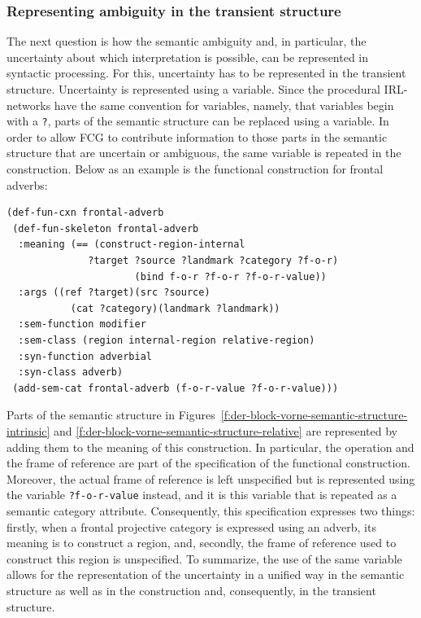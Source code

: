 \subsubsection{Representing ambiguity in the transient structure}
The next question is how the semantic ambiguity and, in particular, the
uncertainty about which interpretation is possible, can be represented 
in syntactic processing. For this, uncertainty has to be represented in the 
transient structure. Uncertainty is represented using a variable. 
Since the procedural IRL-networks have the same convention for variables, 
namely, that variables begin with a {\footnotesize\tt ?}, parts of the 
semantic structure can be replaced using a variable. 
In order to allow FCG to contribute information to those parts in the semantic 
structure that are uncertain or ambiguous, the same variable is repeated in the 
construction. Below as an example is the functional construction for frontal adverbs:

\ea
\label{e:def-fun-frontal-adverb}
\begin{lstlisting}
(def-fun-cxn frontal-adverb 
 (def-fun-skeleton frontal-adverb
  :meaning (== (construct-region-internal 
              ?target ?source ?landmark ?category ?f-o-r)
                      (bind f-o-r ?f-o-r ?f-o-r-value))
  :args ((ref ?target)(src ?source)
           (cat ?category)(landmark ?landmark))
  :sem-function modifier
  :sem-class (region internal-region relative-region)
  :syn-function adverbial
  :syn-class adverb)
 (add-sem-cat frontal-adverb (f-o-r-value ?f-o-r-value)))
\end{lstlisting}
\z

Parts of the semantic structure in Figures~\ref{f:der-block-vorne-semantic-structure-intrinsic} and 
\ref{f:der-block-vorne-semantic-structure-relative} are represented by 
adding them to the meaning of this construction.
In particular, the operation and the frame of reference are part of the 
specification of the functional construction. 
Moreover, the actual frame of reference is left unspecified but is 
represented using the variable {\footnotesize\tt ?f-o-r-value}
instead, and it is this variable that is repeated as a semantic category 
attribute. Consequently, this specification
expresses two things: firstly, when a frontal projective category is 
expressed using an adverb, its 
meaning is to construct a region, and, secondly, the frame of reference used 
to construct this region is unspecified.
To summarize, the use of the same variable allows for the representation 
of the uncertainty in a unified way in the semantic structure 
as well as in the construction and, consequently, in the transient structure.

